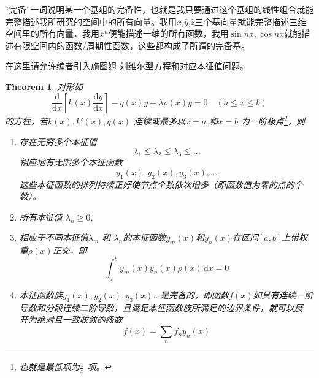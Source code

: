 \documentclass[12pt,a4paper,openany,twoside]{book}
\newtheorem{theorem}{Theorem}[section]
\numberwithin{equation}{section}
\newcommand{\ud}{\mathrm{d}}
\begin{document}
          “完备”一词说明某一个基组的完备性，也就是我只要通过这个基组的线性组合就能完整描述我所研究的空间中的所有向量。我用$\hat{x}$,$\hat{y}$,$\hat{z}$三个基向量就能完整描述三维空间里的所有向量，我用${x^n}$便能描述一维的所有函数，我用${\sin{nx},\cos{nx}}$就能描述有限空间内的函数/周期性函数，这些都构成了所谓的完备基。

          在这里请允许编者引入施图姆-刘维尔型方程和对应本征值问题。
          \begin{theorem}
            对形如
            \begin{equation}
              \frac{\ud }{\ud x} \left[ k(x) \frac{\ud y}{\ud x} \right] -q(x)y + \lambda \rho(x) y = 0 \quad (a\leqslant x \leqslant b)
            \end{equation}
            的方程，若$k(x),k'(x),q(x)$ 连续或最多以$x=a$ 和$x=b$ 为一阶极点\footnote{也就是最低项为$\frac{1}{x}$ 项。}，则
            \begin{enumerate}
              \item 存在无穷多个本征值
                \begin{equation*}
                  \lambda_1 \leqslant \lambda_2 \leqslant \lambda_3 \leqslant ...
                \end{equation*} 
                相应地有无限多个本征函数
                \begin{equation*}
                  y_1(x),y_2(x),y_3(x),...
                \end{equation*}
                这些本征函数的排列持续正好使节点个数依次增多（即函数值为零的点的个数）。
              \item 所有本征值 $\lambda_n \geqslant 0$,
              \item 相应于不同本征值$\lambda_m$ 和 $\lambda_n$的本征函数$y_m(x)$和$y_n(x)$在区间$[a,b]$上带权重$\rho(x)$正交，即
                \begin{equation}
                  \int ^b_a y_m(x) y_n(x) \rho(x) \, \ud x = 0 
                \end{equation}
              \item 本征函数族$y_1(x),y_2(x),y_3(x)...$是完备的，即函数$f(x)$如具有连续一阶导数和分段连续二阶导数，且满足本征函数族所满足的边界条件，就可以展   开为绝对且一致收敛的级数
                \begin{equation*}
                  f(x) = \sum_n f_n y_n(x)
                \end{equation*}
            \end{enumerate}
          \end{theorem}
\end{document}
